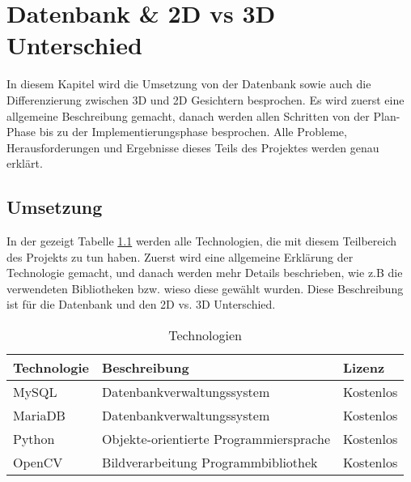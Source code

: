 \chapter{Datenbank \& 2D vs 3D Unterschied}
\label{\docname}
In diesem Kapitel wird die Umsetzung von der Datenbank sowie auch die Differenzierung zwischen 3D und 2D Gesichtern besprochen. Es wird zuerst eine allgemeine Beschreibung gemacht, danach werden allen Schritten von der Plan-Phase bis zu der Implementierungsphase besprochen. Alle Probleme, Herausforderungen und Ergebnisse dieses Teils des Projektes werden genau erklärt.
\section{Umsetzung}
In der gezeigt Tabelle \ref{table:tech} werden alle Technologien, die mit diesem Teilbereich des Projekts  zu tun haben. Zuerst wird eine allgemeine Erklärung der Technologie gemacht, und danach werden mehr Details beschrieben, wie z.B die verwendeten Bibliotheken bzw. wieso diese gewählt wurden. Diese Beschreibung ist für die Datenbank und den 2D vs. 3D Unterschied.

\begin{table}[ht]
	\centering
	\begin{tabular}{ |l|l|l| } 
		\hline		
		Technologie & Beschreibung & Lizenz \\ 
		\hline
		MySQL & Datenbankverwaltungssystem & Kostenlos \\ 
		\hline
		MariaDB & Datenbankverwaltungssystem & Kostenlos \\
		\hline 
		Python & Objekte-orientierte Programmiersprache & Kostenlos \\
		\hline 
		OpenCV &  Bildverarbeitung Programmbibliothek  & Kostenlos \\ 
		\hline
	\end{tabular}
	\caption{Technologien}
	\label{table:tech}
\end{table}
